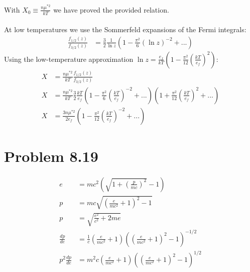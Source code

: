 \documentclass[a4paper,11pt]{article}
\numberwithin{equation}{section}
\begin{document}
With $X_0 \equiv \frac{n\mu^{*2}}{kT}$ we have proved the provided relation.
\\ \\
At low temperatures we use the Sommerfeld expansions of the Fermi integrals:
\begin{align}
 \frac{f_{1/2}(z)}{f_{3/2}(z)} &= \frac{3}{2}\frac{1}{\ln{z}}\left(1-\frac{\pi^2}{6}(\ln{z})^{-2}+...\right)
\end{align}
Using the low-temperature approximation $\ln{z} = \frac{e_f}{kT}\left(1-\frac{\pi^2}{12}(\frac{kT}{e_f})^2 \right)$:
\begin{align}
 X &= \frac{n\mu^{*2}}{kT}\frac{f_{1/2}(z)}{f_{3/2}(z)}\\
 X &= \frac{n\mu^{*2}}{kT}\frac{3}{2}\frac{kT}{e_f}\left(1-\frac{\pi^2}{6}(\frac{kT}{e_f})^{-2}+...\right)\left(1+\frac{\pi^2}{12}(\frac{kT}{e_f})^2+... \right)\\
 X &= \frac{3n\mu^{*2}}{2e_f}\left(1-\frac{\pi^2}{12}(\frac{kT}{e_f})^{-2}+...\right)
\end{align}
\section{Problem 8.19}
\begin{align}
 e &=mc^2\left(\sqrt{1+\left(\frac{p}{mc}\right)^2}-1 \right)\\
 p &=mc\sqrt{(\frac{e}{mc^2}+1)^2-1}\\
 p &=\sqrt{\frac{e^2}{c^2}+2me}\\
 \frac{dp}{de} &= \frac{1}{c}(\frac{e}{mc^2}+1)\left((\frac{e}{mc^2}+1)^2-1 \right)^{-1/2}\\
 p^2 \frac{dp}{de} &= m^2c(\frac{e}{mc^2}+1)\left((\frac{e}{mc^2}+1)^2-1 \right)^{1/2}
\end{align}
\end{document}
